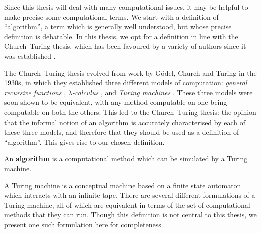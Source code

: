 Since this thesis will deal with many computational issues, it may be helpful to
make precise some computational terms.  We start with a definition of
``algorithm'', a term which is generally well understood, but whose precise
definition is debatable.  In this thesis, we opt for a definition in line with
the Church--Turing thesis, which has been favoured by a variety of authors since
it was established \cite{gurevich_2000, minsky_1967}.

The Church--Turing thesis evolved from work by G\"{o}del, Church and Turing in
the 1930s, in which they established three different models of computation:
\textit{general recursive functions} \cite{godel}, \textit{$\lambda$-calculus}
\cite{church}, and \textit{Turing machines} \cite{turing}.  These three models
were soon shown to be equivalent, with any method computable on one being
computable on both the others.  This led to the Church--Turing thesis: the
opinion that the informal notion of an algorithm is accurately characterised by
each of these three models, and therefore that they should be used as a
definition of ``algorithm''.  This gives rise to our chosen definition.

\begin{definition}
  \label{def:algorithm}
  An \textbf{algorithm} is a computational method which can be simulated by a
  Turing machine.
\end{definition}

A Turing machine is a conceptual machine based on a finite state automaton which
interacts with an infinite tape.  There are several different formulations of a
Turing machine, all of which are equivalent in terms of the set of computational
methods that they can run.  Though this definition is not central to this
thesis, we present one such formulation here for completeness.

